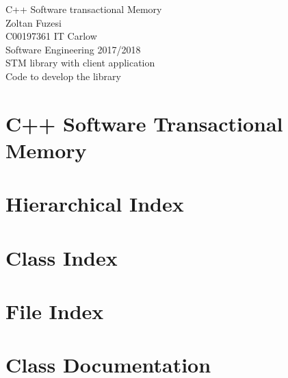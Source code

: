 \documentclass[twoside]{article}
\newcommand{\+}{\discretionary{\mbox{\scriptsize$\hookleftarrow$}}{}{}}
\begin{document}
\hypersetup{pageanchor=false,
             bookmarksnumbered=true,
             pdfencoding=unicode
            }
\begin{titlepage}
\vspace*{7cm}
\begin{center}%
{\Large C++ Software transactional Memory }\\
\vspace*{1cm}
{\large Zoltan Fuzesi}\\
\vspace*{0.5cm}
{\large C00197361 IT Carlow}\\
\vspace*{0.5cm}
{\large Software Engineering 2017/2018}\\
\vspace*{1cm}
{\large STM library with client application}\\
\vspace*{0.5cm}
{\large Code to develop the library}\\
\end{center}
\end{titlepage}
\tableofcontents
{}
\hypersetup{pageanchor=true}

\section{C++ Software Transactional Memory}
\label{index}\hypertarget{index}{}
\section{Hierarchical Index}

\section{Class Index}

\section{File Index}

\section{Class Documentation}

















\end{document}
